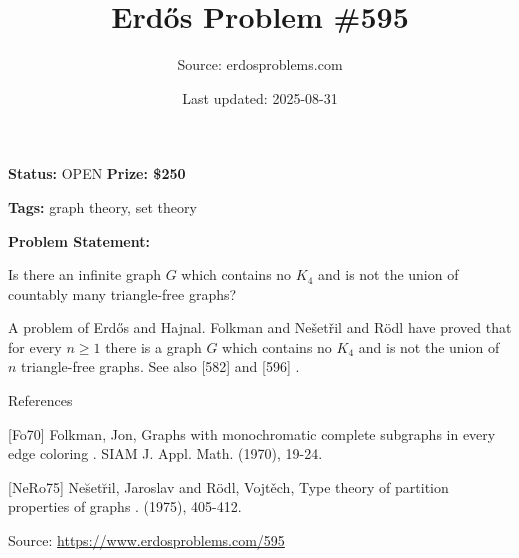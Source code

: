 \documentclass{article}
\title{Erd\H{o}s Problem \#595}
\date{Last updated: 2025-08-31}
\author{Source: erdosproblems.com}
\begin{document}
\maketitle

\noindent\textbf{Status:} OPEN \quad \textbf{Prize: \$250}

\noindent\textbf{Tags:} graph theory, set theory

\medskip

\noindent\textbf{Problem Statement:}

Is there an infinite graph $G$ which contains no $K_4$ and is not the union of countably many triangle-free graphs?




A problem of Erd\H{o}s and Hajnal. Folkman \cite{Fo70} and Ne\v{s}et\v{r}il and R\"{o}dl \cite{NeRo75} have proved that for every $n\geq 1$ there is a graph $G$ which contains no $K_4$ and is not the union of $n$ triangle-free graphs. See also [582] and [596] .




References

[Fo70] Folkman, Jon, Graphs with monochromatic complete subgraphs in every edge coloring . SIAM J. Appl. Math. (1970), 19-24.

[NeRo75] Ne\u set\u ril, Jaroslav and R\"odl, Vojt\v ech, Type theory of partition properties of graphs . (1975), 405-412.


\bigskip
\noindent\small{Source: \url{https://www.erdosproblems.com/595}}
\end{document}
